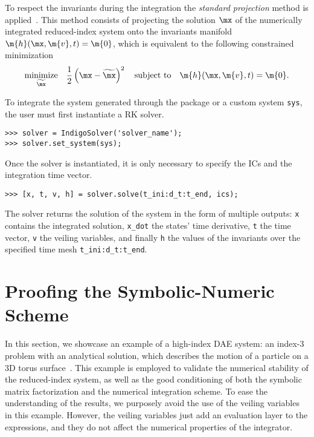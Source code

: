 To respect the invariants during the integration the \emph{standard projection} method is applied~\cite{hairer2000symmetric}. This method consists of projecting the solution $\mx$ of the numerically integrated reduced-index system onto the invariants manifold $\m{h}(\mx, \m{v}, t) = \m{0}$, which is equivalent to the following constrained minimization
%
\begin{equation*}
  \underset{\widetilde{\mx}}{\textrm{minimize}} \quad \dfrac{1}{2}\left(\mx - \widetilde{\mx}\right)^2
    \quad \textrm{subject to} \quad
    \m{h}(\mx, \m{v}, t) = \m{0}.
\end{equation*}

To integrate the system generated through the \Matlab{} package or a custom system \texttt{sys}, the user must first instantiate a \Indigo{} \ac{RK} solver.
%
\begin{verbatim}
>>> solver = IndigoSolver('solver_name');
>>> solver.set_system(sys);
\end{verbatim}
%
Once the solver is instantiated, it is only necessary to specify the \acp{IC} and the integration time vector.
%
\begin{verbatim}
>>> [x, t, v, h] = solver.solve(t_ini:d_t:t_end, ics);
\end{verbatim}
%
The solver returns the solution of the system in the form of multiple outputs: \texttt{x} contains the integrated solution, \texttt{x\_dot} the states' time derivative, \texttt{t} the time vector, \texttt{v} the veiling variables, and finally \texttt{h} the values of the invariants over the specified time mesh \texttt{t\_ini:d\_t:t\_end}.


\section{Proofing the Symbolic-Numeric Scheme}
\label{chap4:sec:example}

In this section, we showcase an example of a high-index \ac{DAE} system: an index-3 problem with an analytical solution, which describes the motion of a particle on a 3D torus surface~\cite{campbell1995constraint}. This example is employed to validate the numerical stability of the reduced-index system, as well as the good conditioning of both the symbolic matrix factorization and the numerical integration scheme. To ease the understanding of the results, we purposely avoid the use of the veiling variables in this example. However, the veiling variables just add an evaluation layer to the expressions, and they do not affect the numerical properties of the integrator.

